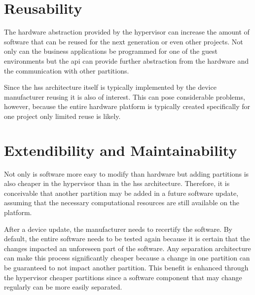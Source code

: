

\section{Reusability}
The hardware abstraction provided by the hypervisor can increase the amount of software that can be reused for the next generation or even other projects. Not only can the business applications be programmed for one of the guest environments but the \acrshort{api} can provide further abstraction from the hardware and the communication with other partitions.

Since the \acrshort{hss} architecture itself is typically implemented by the device manufacturer reusing it is also of interest. This can pose considerable problems, however, because the entire hardware platform is typically created specifically for one project only limited reuse is likely.


\section{Extendibility and Maintainability}
Not only is software more easy to modify than hardware but adding partitions is also cheaper in the hypervisor than in the \acrshort{hss} architecture. Therefore, it is conceivable that another partition may be added in a future software update, assuming that the necessary computational resources are still available on the platform. 

After a device update, the manufacturer needs to recertify the software. By default, the entire software needs to be tested again because it is certain that the changes impacted an unforeseen part of the software. Any separation architecture can make this process significantly cheaper because a change in one partition can be guaranteed to not impact another partition. This benefit is enhanced through the hypervisor cheaper partitions since a software component that may change regularly can be more easily separated.


